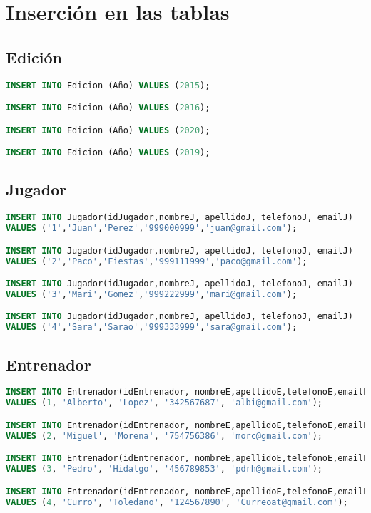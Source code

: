 \section{Inserción en las tablas}
\subsection{Edición}
\begin{lstlisting}[language=sql]
INSERT INTO Edicion (Año) VALUES (2015);

INSERT INTO Edicion (Año) VALUES (2016);

INSERT INTO Edicion (Año) VALUES (2020);

INSERT INTO Edicion (Año) VALUES (2019);
\end{lstlisting}

\subsection{Jugador}
\begin{lstlisting}[language=sql]
INSERT INTO Jugador(idJugador,nombreJ, apellidoJ, telefonoJ, emailJ)
VALUES ('1','Juan','Perez','999000999','juan@gmail.com');

INSERT INTO Jugador(idJugador,nombreJ, apellidoJ, telefonoJ, emailJ)
VALUES ('2','Paco','Fiestas','999111999','paco@gmail.com');

INSERT INTO Jugador(idJugador,nombreJ, apellidoJ, telefonoJ, emailJ)
VALUES ('3','Mari','Gomez','999222999','mari@gmail.com');

INSERT INTO Jugador(idJugador,nombreJ, apellidoJ, telefonoJ, emailJ)
VALUES ('4','Sara','Sarao','999333999','sara@gmail.com');

\end{lstlisting}

\subsection{Entrenador}
\begin{lstlisting}[language=sql]
INSERT INTO Entrenador(idEntrenador, nombreE,apellidoE,telefonoE,emailE)
VALUES (1, 'Alberto', 'Lopez', '342567687', 'albi@gmail.com');

INSERT INTO Entrenador(idEntrenador, nombreE,apellidoE,telefonoE,emailE)
VALUES (2, 'Miguel', 'Morena', '754756386', 'morc@gmail.com');

INSERT INTO Entrenador(idEntrenador, nombreE,apellidoE,telefonoE,emailE)
VALUES (3, 'Pedro', 'Hidalgo', '456789853', 'pdrh@gmail.com');

INSERT INTO Entrenador(idEntrenador, nombreE,apellidoE,telefonoE,emailE)
VALUES (4, 'Curro', 'Toledano', '124567890', 'Curreoat@gmail.com');
\end{lstlisting}

